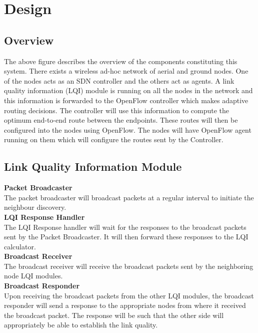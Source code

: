 \documentclass{article}
\begin{document}
\section{Design}
\subsection{Overview}
The above figure describes the overview of the components constituting this system. There exists a wireless ad-hoc
network of aerial and ground nodes. One of the nodes acts as an SDN controller and the others act as agents. A link
quality information (LQI) module is running on all the nodes in the network and this information is forwarded to the
OpenFlow controller which makes adaptive routing decisions. The controller will use this information to compute the
optimum end-to-end route between the endpoints. These routes will then be configured into the nodes using OpenFlow. The
nodes will have OpenFlow agent running on them which will configure the routes sent by the Controller. 
\subsection{Link Quality Information Module}
\noindent \textbf{Packet Broadcaster} \\
The packet broadcaster will broadcast packets at a regular interval to initiate the neighbour discovery. \\

\noindent \textbf{LQI Response Handler} \\
The LQI Response handler will wait for the responses to the broadcast packets sent by the Packet Broadcaster. It will
then forward these responses to the LQI calculator. \\

\noindent \textbf{Broadcast Receiver} \\
The broadcast receiver will receive the broadcast packets sent by the neighboring node LQI modules. \\

\noindent \textbf{Broadcast Responder} \\
Upon receiving the broadcast packets from the other LQI modules, the broadcast responder will send a response to the
appropriate nodes from where it received the broadcast packet. The response will be such that the other side will
appropriately be able to establish the link quality.\\
\end{document}
